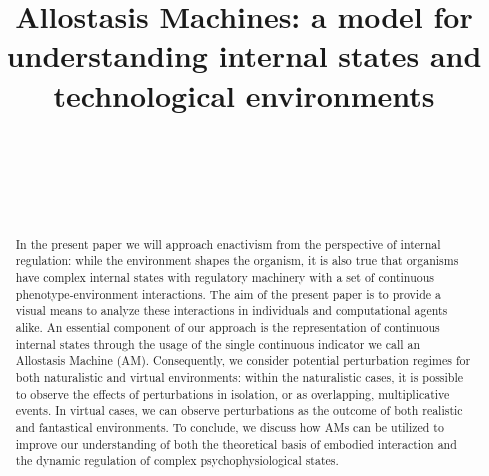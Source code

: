 \documentclass{sigchi}
\def\plaintitle{Allostasis Machines: a model for understanding internal states and technological environments}
\begin{document}
\title{\plaintitle}

\author{%
  \\
  \\
  \\
    \\
}

\maketitle

\begin{abstract}
In the present paper we will approach enactivism from the perspective of internal regulation: while the environment shapes the organism, it is also true that organisms have complex internal states with regulatory machinery with a set of continuous phenotype-environment interactions. The aim of the present paper is to provide a visual means to analyze these interactions in individuals and computational agents alike.  An essential component of our approach is the representation of continuous internal states through the usage of the single continuous indicator we call an Allostasis Machine (AM). Consequently, we consider potential perturbation regimes for both naturalistic and virtual environments: within the naturalistic cases, it is possible to observe the effects of perturbations in isolation, or as overlapping, multiplicative events. In virtual cases, we can observe perturbations as the outcome of both realistic and fantastical environments. To conclude, we discuss how AMs can be utilized to improve our understanding of both the theoretical basis of embodied interaction and the dynamic regulation of complex psychophysiological states.
\end{abstract}
\end{document}
